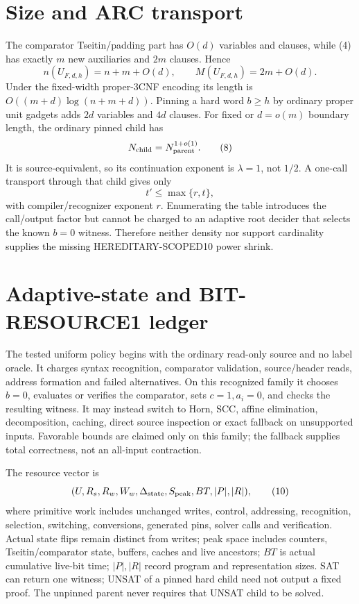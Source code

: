 \documentclass[11pt]{article}
\begin{document}
\section{Size and ARC transport}
The comparator Tseitin/padding part has $O(d)$ variables and clauses, while
(4) has exactly $m$ new auxiliaries and $2m$ clauses.  Hence
\[
 n(U_{F,d,h})=n+m+O(d),\qquad M(U_{F,d,h})=2m+O(d).                \tag{7}
\]
Under the fixed-width proper-3CNF encoding its length is
$O((m+d)\log(n+m+d))$.  Pinning a hard word $b\ge h$ by ordinary proper
unit gadgets adds $2d$ variables and $4d$ clauses.  For fixed or
$d=o(m)$ boundary length, the ordinary pinned child has
\[
 N_{\rm child}=N_{\rm parent}^{1+o(1)}.                            \tag{8}
\]
It is source-equivalent, so its continuation exponent is $\lambda=1$, not
$1/2$.  A one-call transport through that child gives only
\[
 t'\le\max\{r,t\},                                                 \tag{9}
\]
with compiler/recognizer exponent $r$.  Enumerating the table introduces
the call/output factor but cannot be charged to an adaptive root decider
that selects the known $b=0$ witness.  Therefore neither density nor
support cardinality supplies the missing HEREDITARY-SCOPED10 power shrink.

\section{Adaptive-state and BIT-RESOURCE1 ledger}
The tested uniform policy begins with the ordinary read-only source and no
label oracle.  It charges syntax recognition, comparator validation,
source/header reads, address formation and failed alternatives.  On this
recognized family it chooses $b=0$, evaluates or verifies the comparator,
sets $c=1,a_i=0$, and checks the resulting witness.  It may instead switch
to Horn, SCC, affine elimination, decomposition, caching, direct source
inspection or exact fallback on unsupported inputs.  Favorable bounds are
claimed only on this family; the fallback supplies total correctness, not
an all-input contraction.

The resource vector is
\[
 (U,R_s,R_w,W_w,\Delta_{\rm state},S_{\rm peak},BT,|P|,|R|),      \tag{10}
\]
where primitive work includes unchanged writes, control, addressing,
recognition, selection, switching, conversions, generated pins, solver
calls and verification.  Actual state flips remain distinct from writes;
peak space includes counters, Tseitin/comparator state, buffers, caches and
live ancestors; $BT$ is actual cumulative live-bit time; $|P|,|R|$ record
program and representation sizes.  SAT can return one witness; UNSAT of a
pinned hard child need not output a fixed proof.  The unpinned parent never
requires that UNSAT child to be solved.
\end{document}

